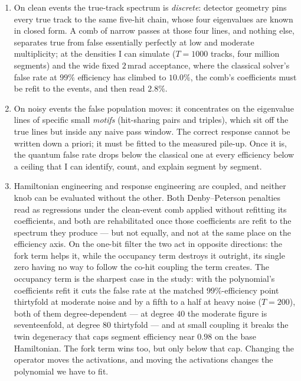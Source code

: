 \documentclass[11pt,a4paper]{article}
\begin{document}
\begin{enumerate}[leftmargin=2em]
\item On clean events the true-track spectrum is \emph{discrete}: detector
geometry pins every true track to the same five-hit chain, whose four
eigenvalues are known in closed form. A comb of narrow passes at those
four lines, and nothing else, separates true from false essentially
perfectly at low and moderate multiplicity; at the densities I can
simulate ($T=1000$ tracks, four million segments) and the wide fixed
$2$\,mrad acceptance, where the classical solver's false rate at
$99\%$ efficiency has climbed to $10.0\%$, the comb's coefficients must
be refit to the events, and then read $2.8\%$.
\item On noisy events the false population moves: it concentrates on the
eigenvalue lines of specific small \emph{motifs} (hit-sharing pairs and
triples), which sit off the true lines but inside any naive pass window.
The correct response cannot be written down a priori; it must be fitted
to the measured pile-up. Once it is, the quantum false rate drops below
the classical one at every efficiency below a ceiling that I can
identify, count, and explain segment by segment.
\item Hamiltonian engineering and response engineering are coupled, and
neither knob can be evaluated without the other. Both Denby--Peterson
penalties read as regressions under the clean-event comb applied
without refitting its coefficients, and both are rehabilitated once
those coefficients are refit to the spectrum they produce --- but not
equally, and not at the same place on the efficiency axis. On the
one-bit filter the two act in opposite directions: the fork term helps
it, while the occupancy term destroys it outright, its single zero
having no way to follow the co-hit coupling the term creates. The
occupancy term is the sharpest case in the study: with the polynomial's
coefficients refit it cuts the false rate at the matched
$99\%$-efficiency point thirtyfold at moderate noise and by a fifth to
a half at heavy noise ($T{=}200$), both of them degree-dependent --- at
degree $40$ the moderate figure is seventeenfold, at degree $80$
thirtyfold --- and at small coupling it breaks the twin degeneracy that
caps segment efficiency near $0.98$ on the base Hamiltonian. The fork
term wins too, but only below that cap. Changing the operator moves
the activations, and moving the activations changes the polynomial we
have to fit.
\end{enumerate}
\end{document}
